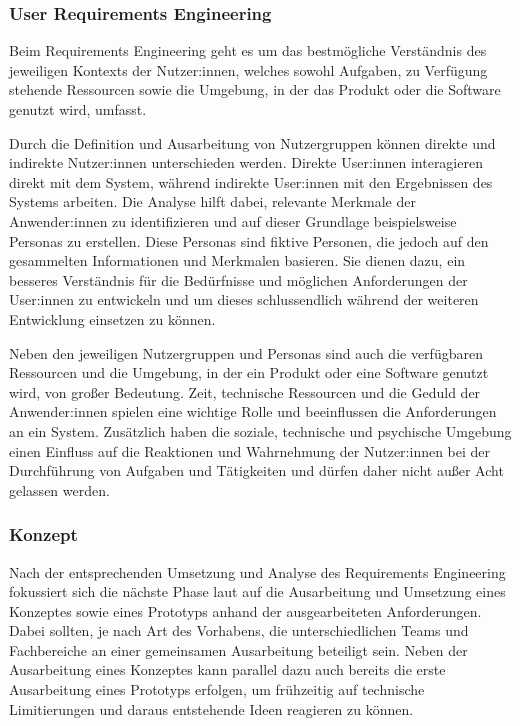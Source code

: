 \documentclass[a4paper,12pt,twoside]{scrreprt}
\begin{document}
\subsubsection*{User Requirements Engineering}
\label{sub-sub-sec:user-requirements-engineering}
Beim Requirements Engineering geht es um das bestmögliche Verständnis des jeweiligen Kontexts der Nutzer:innen, welches sowohl Aufgaben, zu Verfügung stehende Ressourcen sowie die Umgebung, in der das Produkt oder die Software genutzt wird, umfasst. \cite{frieling_user_2019}

\medskip

Durch die Definition und Ausarbeitung von Nutzergruppen können direkte und indirekte Nutzer:innen unterschieden werden. Direkte User:innen interagieren direkt mit dem System, während indirekte User:innen mit den Ergebnissen des Systems arbeiten. Die Analyse hilft dabei, relevante Merkmale der Anwender:innen zu identifizieren und auf dieser Grundlage beispielsweise Personas zu erstellen. Diese Personas sind fiktive Personen, die jedoch auf den gesammelten Informationen und Merkmalen basieren. Sie dienen dazu, ein besseres Verständnis für die Bedürfnisse und möglichen Anforderungen der User:innen zu entwickeln und um dieses schlussendlich während der weiteren Entwicklung einsetzen zu können. \cite{frieling_user_2019}

\medskip

Neben den jeweiligen Nutzergruppen und Personas sind auch die verfügbaren Ressourcen und die Umgebung, in der ein Produkt oder eine Software genutzt wird, von großer Bedeutung. Zeit, technische Ressourcen und die Geduld der Anwender:innen spielen eine wichtige Rolle und beeinflussen die Anforderungen an ein System. Zusätzlich haben die soziale, technische und psychische Umgebung einen Einfluss auf die Reaktionen und Wahrnehmung der Nutzer:innen bei der Durchführung von Aufgaben und Tätigkeiten und dürfen daher nicht außer Acht gelassen werden. \cite{frieling_user_2019}

\subsubsection*{Konzept}
\label{sub-sub-sec:konzept}

Nach der entsprechenden Umsetzung und Analyse des Requirements Engineering fokussiert sich die nächste Phase laut \cite{frieling_user_2019} auf die Ausarbeitung und Umsetzung eines Konzeptes sowie eines Prototyps anhand der ausgearbeiteten Anforderungen. Dabei sollten, je nach Art des Vorhabens, die unterschiedlichen Teams und Fachbereiche an einer gemeinsamen Ausarbeitung beteiligt sein. Neben der Ausarbeitung eines Konzeptes kann parallel dazu auch bereits die erste Ausarbeitung eines Prototyps erfolgen, um frühzeitig auf technische Limitierungen und daraus entstehende Ideen reagieren zu können. \cite{frieling_user_2019}
\end{document}
